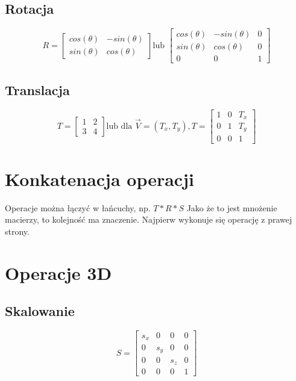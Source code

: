 \documentclass{../notatki}
\begin{document}
\subsection{Rotacja}

$$
R = \begin{bmatrix}
        cos(\theta) & -sin(\theta) \\
        sin(\theta) & cos(\theta)
    \end{bmatrix}
\text{lub }
\begin{bmatrix} cos(\theta) & -sin(\theta) & 0 \\ sin(\theta) & cos(\theta) & 0 \\ 0 & 0 & 1 \end{bmatrix}
$$

\subsection{Translacja}

$$
T = 
\begin{bmatrix}
    1 & 2 \\
    3 & 4
\end{bmatrix}
\text{lub dla } 
\vec{V}=(T_x, T_y),
T=
\begin{bmatrix} 1 & 0 & T_x \\ 0 & 1 & T_y \\ 0 & 0 & 1 \end{bmatrix}
$$

\section{Konkatenacja operacji}

Operacje można łączyć w łańcuchy, np. $T * R * S$
Jako że to jest mnożenie macierzy, to kolejność ma znaczenie.
Najpierw wykonuje się operację z prawej strony.

\section{Operacje 3D}

\subsection{Skalowanie}

$$
S = \begin{bmatrix} s_x & 0 & 0 & 0 \\ 0 & s_y & 0 & 0 \\ 0 & 0 & s_z & 0 \\ 0 & 0 & 0 & 1 \end{bmatrix}
$$
\end{document}
